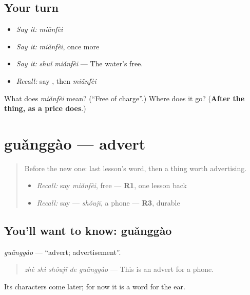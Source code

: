 \subsection*{Your turn}
\begin{itemize}
\raggedright
  \item \emph{Say it:} \emph{miǎnfèi}
  \item \emph{Say it:} \emph{miǎnfèi}, once more
  \item \emph{Say it:} \emph{shuǐ miǎnfèi} — The water's free.
  \item \emph{Recall:} say , then \emph{miǎnfèi}
\end{itemize}

\begin{tcolorbox}[breakable,colback=teal!4,colframe=teal!35!black,title={Before you move on}]
What does \emph{miǎnfèi} mean? (\textquotedblleft{}Free of charge\textquotedblright{}.) Where does it go? (\textbf{After the thing, as a price does}.)
\end{tcolorbox}
\section[guǎnggào]{guǎnggào — advert}

\label{lesson:ZH-C156-guanggao}



\begin{quote}
Before the new one: last lesson's word, then a thing worth advertising.

\begin{itemize}
\raggedright
  \item \emph{Recall:} say \emph{miǎnfèi}, free — \textbf{R1}, one lesson back
  \item \emph{Recall:} say  — \emph{shǒujī}, a phone — \textbf{R3}, durable
\end{itemize}
\end{quote}

\subsection*{You'll want to know: guǎnggào}
\emph{guǎnggào} — \textquotedblleft{}advert; advertisement\textquotedblright{}.

\begin{quote}
\emph{zhè shì shǒujī de guǎnggào} — This is an advert for a phone.
\end{quote}

Its characters come later; for now it is a word for the ear.

